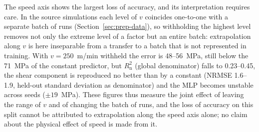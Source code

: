 \documentclass[subscriptcorrection,upint,varvw,barcolor=Goldenrod3,mathalfa=cal=euler,balance,hyphenate,french,pdf-a]{asmejour} %
\begin{document}
The speed axis shows the largest loss of accuracy, and its interpretation requires care. In the source simulations each level of $v$ coincides one-to-one with a separate batch of runs (Section~\ref{sec:prep-data}), so withholding the highest level removes not only the extreme level of a factor but an entire batch: extrapolation along $v$ is here inseparable from a transfer to a batch that is not represented in training. With $v=250$~m/min withheld the error is 48--56~MPa, still below the 71~MPa of the constant predictor, but $R^2_{\mathrm{n}}$ (global denominator) falls to 0.23--0.45, the shear component is reproduced no better than by a constant (NRMSE 1.6--1.9, held-out standard deviation as denominator) and %
the MLP becomes unstable across seeds ($\pm19$~MPa). These figures thus measure the joint effect of leaving the range of $v$ and of changing the batch of runs, and the loss of accuracy on this split cannot be attributed to extrapolation along the speed axis alone; no claim about the physical effect of speed is made from it. %

\end{document}
